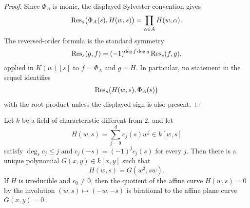 \begin{proof}
Since \(\Phi_A\) is monic, the displayed Sylvester convention gives
\[
  \operatorname{Res}_s\bigl(\Phi_A(s),H(w,s)\bigr)
    =\prod_{\alpha\in A}H(w,\alpha).
\]
The reversed-order formula is the standard symmetry
\[
  \operatorname{Res}_s(g,f)=(-1)^{\deg f\deg g}\operatorname{Res}_s(f,g),
\]
applied in \(K(w)[s]\) to \(f=\Phi_A\) and \(g=H\). In particular,
no statement in the sequel identifies
\[
  \operatorname{Res}_s\bigl(H(w,s),\Phi_A(s)\bigr)
\]
with the root product unless the displayed sign is also present.
\end{proof}

\begin{lemma}
  \label{lem:sign-quotient-normal-form}

  Let \(k\) be a field of characteristic different from \(2\), and let
  \[
    H(w,s)=\sum_{j=0}^d c_j(s)w^j\in k[w,s]
  \]
  satisfy \(\deg_s c_j\le j\) and \(c_j(-s)=(-1)^j c_j(s)\) for every
  \(j\). Then there is a unique polynomial \(G(x,y)\in k[x,y]\) such
  that
  \[
    H(w,s)=G(w^2,sw).
  \]
  If \(H\) is irreducible and \(c_0\ne0\), then the quotient of the
  affine curve \(H(w,s)=0\) by the involution
  \((w,s)\mapsto(-w,-s)\) is birational to the affine plane curve
  \(G(x,y)=0\).
\end{lemma}

